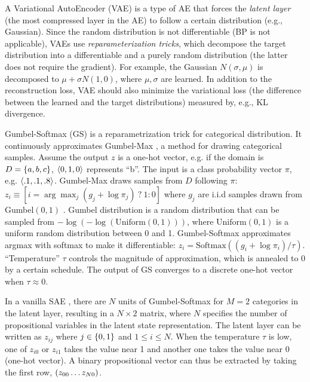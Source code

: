 A Variational AutoEncoder (VAE) \cite{kingma2013auto} is a type of AE that forces the \emph{latent layer} (the most compressed layer in the AE) to follow a certain distribution (e.g., Gaussian).
Since the random distribution is not differentiable (BP is not applicable), VAEs use \emph{reparameterization tricks}, which decompose the target distribution into a differentiable and a purely random distribution (the latter does not require the gradient).
For example, the Gaussian $N(\sigma,\mu)$ is decomposed to $\mu+\sigma N(1,0)$, where $\mu,\sigma$ are learned.
In addition to the reconstruction loss, VAE should also minimize the variational loss (the difference between the learned and the target distributions) measured by, e.g.,  KL divergence.

Gumbel-Softmax (GS) is a re\-para\-metri\-zation trick \cite{jang2016categorical} for categorical distribution.
It continuously approximates Gumbel-Max \cite{maddison2014sampling}, a method for drawing categorical samples.
Assume the output $z$ is a one-hot vector, e.g. if the domain is $D={\left\{a,b,c\right\}}$, ${\left<0,1,0\right>}$ represents ``b''.
The input is a class probability vector $\pi$, e.g. ${\left<.1,.1,.8\right>}$.
Gumbel-Max draws samples from $D$ following $\pi$:
 $z_i \equiv [ i = \arg \max_j (g_j+\log \pi_j)\ ?\ 1 : 0 ]$
where $g_j$ are i.i.d samples drawn from Gumbel$(0,1)$ \cite{gumbel1954statistical}.
Gumbel distribution is a random distribution that can be sampled from $-\log (-\log (\text{Uniform}(0,1)))$, where
$\text{Uniform}(0,1)$ is a uniform random distribution between 0 and 1.
Gumbel-Softmax approximates argmax with softmax to make it differentiable:
$z_i = \text{Softmax}((g_i+\log \pi_i)/\tau)$.
``Temperature'' $\tau$ controls the magnitude of approximation, which is annealed to 0 by a certain schedule.
The output of GS converges to a discrete one-hot vector when $\tau\approx 0$.

In a vanilla SAE \cite{Asai2018}, there are $N$ units of Gumbel-Softmax
for $M=2$ categories in the latent layer, resulting in a $N\times 2$ matrix,
where $N$ specifies the number of propositional variables in the latent
state representation. The latent layer can be written as
$z_{ij}$ where $j\in {\left\{0,1\right\}}$ and $1\leq i \leq N$.  When the
temperature $\tau$ is low, one of $z_{i0}$ or $z_{i1}$ takes the value
near 1 and another one takes the value near 0 (one-hot vector).  A binary
propositional vector can thus be extracted by taking the first row,
${\left(z_{00}\ldots z_{N0}\right)}$.

